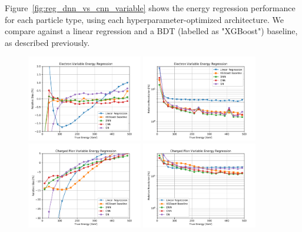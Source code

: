 Figure~\ref{fig:reg_dnn_vs_cnn_variable} shows the energy regression performance for each particle type, using each hyperparameter-optimized architecture. We compare against a linear regression and a BDT (labelled as "XGBoost") baseline, as described previously.

\begin{figure}[htbp]
\centering
\includegraphics[width=0.45\textwidth]{Images/Calo/bias_vs_E_Ele_variable.pdf}
\includegraphics[width=0.45\textwidth]{Images/Calo/res_vs_E_Ele_variable.pdf} \\
\includegraphics[width=0.45\textwidth]{Images/Calo/bias_vs_E_ChPi_variable.pdf}
\includegraphics[width=0.45\textwidth]{Images/Calo/res_vs_E_ChPi_variable.pdf} \\

\end{figure}
